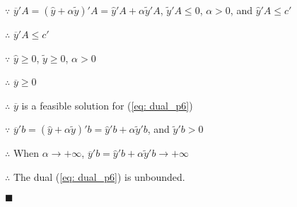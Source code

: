 $\because $ $\overline{y}'A=(\widehat{y}+\alpha\tilde{y})'A=\widehat{y}'A+\alpha\tilde{y}'A$, $\tilde{y}'A\leq0$, $\alpha>0$, and $\widehat{y}'A\leq c'$

$\therefore $ $\overline{y}'A\leq{}c'$

$\because $ $\widehat{y}\geq0$, $\tilde{y}\geq0$, $\alpha>0$

$\therefore $ $\overline{y}\geq0$

$\therefore $ $\overline{y}$ is a feasible solution for (\ref{eq: dual_p6})

$\because $ $\overline{y}'b=(\widehat{y}+\alpha\tilde{y})'b=\widehat{y}'b+\alpha\tilde{y}'b$, and $\tilde{y}'b>0$

$\therefore $ When $\alpha\rightarrow +\infty$,  $\overline{y}'b=\widehat{y}'b+\alpha\tilde{y}'b\rightarrow +\infty$

$\therefore $ The dual (\ref{eq: dual_p6}) is unbounded.
\begin{flushright} $\blacksquare$ \end{flushright}


